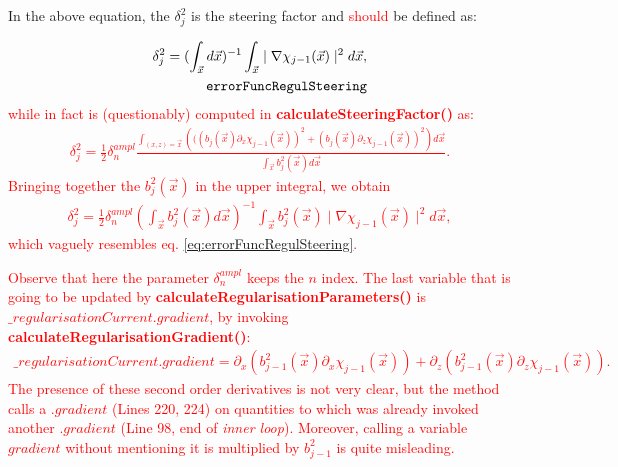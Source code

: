 \documentclass[10pt,a4paper]{article}
\begin{document}
In the above equation, the $\delta_{j}^2$ is the steering factor and
\textcolor{red}{should} be defined as:

\begin{align} \label{eq:errorFuncRegulSteering} \delta_{j}^2 = (\int_{\vec{x}}
d\vec{x})^{-1} \int_{\vec{x}} \mid\nabla\chi_{j-1}(\vec{x})\mid^2 d\vec{x},\\
\tag*{\texttt{errorFuncRegulSteering}}
\end{align}
\textcolor{red}{while in fact is (questionably) computed in \textbf{calculateSteeringFactor()} as:
\begin{align}  \delta_j^2 = \frac{1}{2} \delta^{ampl}_n \frac{\int_{(x,z) = \vec{x}}\left(((b_j(\vec{x}) \partial_x \chi_{j-1}(\vec{x}))^2  + (b_j(\vec{x}) \partial_z \chi_{j-1}(\vec{x}))^2\right) d \vec{x}}{\int_{\vec{x}}b_j^2(\vec{x}) d \vec{x}}.
\end{align}
Bringing together the $b_j^2(\vec{x})$ in the upper integral, we obtain
\begin{align}
\delta_{j}^2 = \frac{1}{2} \delta^{ampl}_n \left(\int_{\vec{x}}
b_j^2(\vec{x})d\vec{x}\right)^{-1} \int_{\vec{x}} b_j^2(\vec{x}) \mid\nabla\chi_{j-1}(\vec{x})\mid^2 d\vec{x},
\end{align}
which vaguely resembles eq. \eqref{eq:errorFuncRegulSteering}.
}
\newline

\textcolor{red}{
Observe that here the parameter $\delta^{ampl}_n$ keeps the $n$ index.
}
\textcolor{red}{The last variable that is going to be updated by \textbf{calculateRegularisationParameters()} is $\_regularisationCurrent.gradient$, by invoking \textbf{calculateRegularisationGradient()}:
\begin{align} 
\label{eq:calculateRegularisationGradient}
\_regularisationCurrent.gradient = \partial_x (b^2_{j-1} (\vec{x}) \partial_x \chi_{j-1} (\vec{x}) ) + \partial_z (b^2_{j-1} (\vec{x}) \partial_z \chi_{j-1} (\vec{x}) ).
\end{align}
The presence of these second order derivatives is not very clear, but the method calls a $.gradient$ (Lines 220, 224) on quantities to which was already invoked another $.gradient$ (Line 98, end of \textit{inner loop}). 
Moreover, calling a variable $gradient$ without mentioning it is multiplied by $b_{j-1}^2$ is quite misleading.
}
\newline
\end{document}
